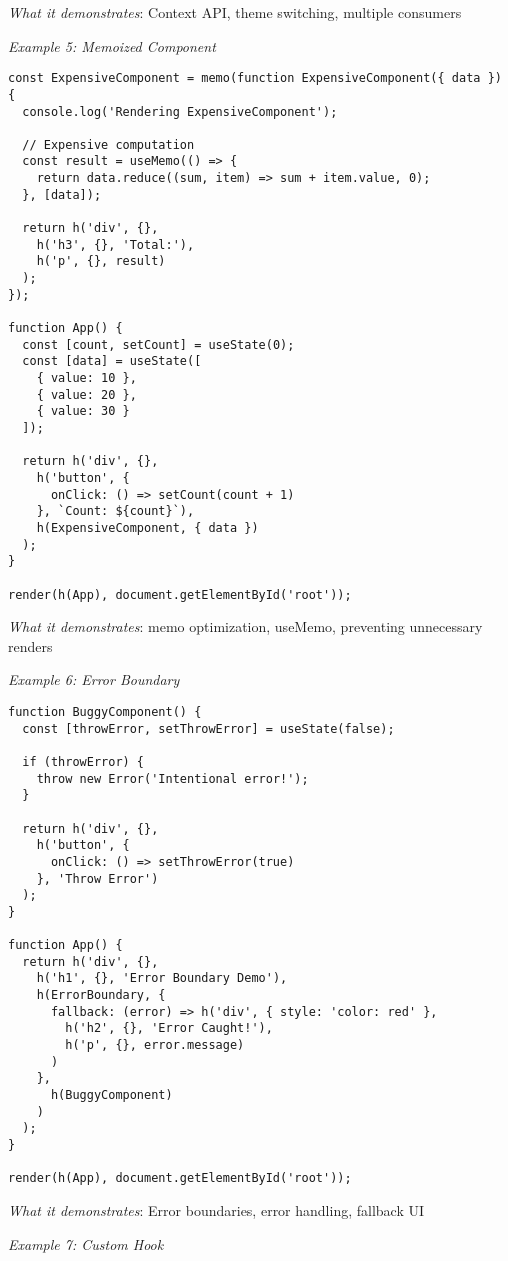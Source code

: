 \documentclass[11pt]{article}
\begin{document}
\emph{What it demonstrates}: Context API, theme switching, multiple consumers

\emph{Example 5: Memoized Component}

\begin{verbatim}
const ExpensiveComponent = memo(function ExpensiveComponent({ data }) {
  console.log('Rendering ExpensiveComponent');
  
  // Expensive computation
  const result = useMemo(() => {
    return data.reduce((sum, item) => sum + item.value, 0);
  }, [data]);
  
  return h('div', {},
    h('h3', {}, 'Total:'),
    h('p', {}, result)
  );
});

function App() {
  const [count, setCount] = useState(0);
  const [data] = useState([
    { value: 10 },
    { value: 20 },
    { value: 30 }
  ]);
  
  return h('div', {},
    h('button', {
      onClick: () => setCount(count + 1)
    }, `Count: ${count}`),
    h(ExpensiveComponent, { data })
  );
}

render(h(App), document.getElementById('root'));
\end{verbatim}

\emph{What it demonstrates}: memo optimization, useMemo, preventing unnecessary renders

\emph{Example 6: Error Boundary}

\begin{verbatim}
function BuggyComponent() {
  const [throwError, setThrowError] = useState(false);
  
  if (throwError) {
    throw new Error('Intentional error!');
  }
  
  return h('div', {},
    h('button', {
      onClick: () => setThrowError(true)
    }, 'Throw Error')
  );
}

function App() {
  return h('div', {},
    h('h1', {}, 'Error Boundary Demo'),
    h(ErrorBoundary, {
      fallback: (error) => h('div', { style: 'color: red' },
        h('h2', {}, 'Error Caught!'),
        h('p', {}, error.message)
      )
    },
      h(BuggyComponent)
    )
  );
}

render(h(App), document.getElementById('root'));
\end{verbatim}

\emph{What it demonstrates}: Error boundaries, error handling, fallback UI

\emph{Example 7: Custom Hook}
\end{document}
